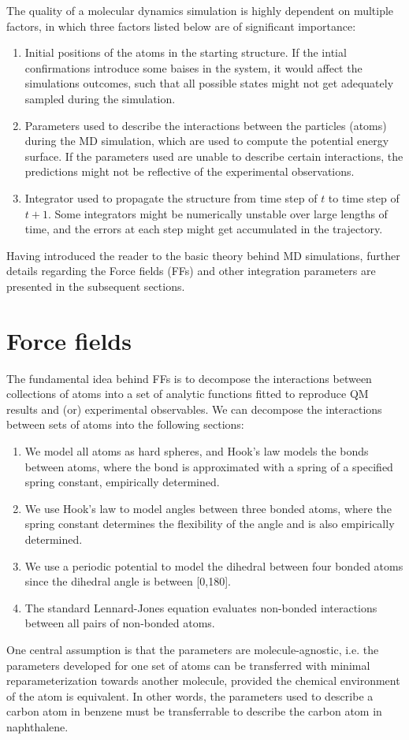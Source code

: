 The quality of a molecular dynamics simulation is highly dependent on multiple factors, in which three factors listed below are of significant importance:
\begin{enumerate}
    \item Initial positions of the atoms in the starting structure. If the intial confirmations introduce some baises in the system, it would affect the simulations outcomes, such that all possible states might not get adequately sampled during the simulation.
    \item Parameters used to describe the interactions between the particles (atoms) during the MD simulation, which are used to compute the potential energy surface. If the parameters used are unable to describe certain interactions, the predictions might not be reflective of the experimental observations.
    \item Integrator used to propagate the structure from time step of $t$ to time step of $t+1$. Some integrators might be numerically unstable over large lengths of time, and the errors at each step might get accumulated in the trajectory.
\end{enumerate}

Having introduced the reader to the basic theory behind MD simulations, further details regarding the Force fields (FFs) and other integration parameters are presented in the subsequent sections.
\section{Force fields}
The fundamental idea behind FFs is to decompose the interactions between collections of atoms into a set of analytic functions fitted to reproduce QM results and (or) experimental observables. We can decompose the interactions between sets of atoms into the following sections:
\begin{enumerate}
    \item We model all atoms as hard spheres, and Hook's law models the bonds between atoms, where the bond is approximated with a spring of a specified spring constant, empirically determined. 
    \item We use Hook's law to model angles between three bonded atoms, where the spring constant determines the flexibility of the angle and is also empirically determined. 
    \item We use a periodic potential to model the dihedral between four bonded atoms since the dihedral angle is between [0,180]. 
    \item The standard Lennard-Jones equation evaluates non-bonded interactions between all pairs of non-bonded atoms.
\end{enumerate}
One central assumption is that the parameters are molecule-agnostic, i.e. the parameters developed for one set of atoms can be transferred with minimal reparameterization towards another molecule, provided the chemical environment of the atom is equivalent. In other words, the parameters used to describe a carbon atom in benzene must be transferrable to describe the carbon atom in naphthalene.

